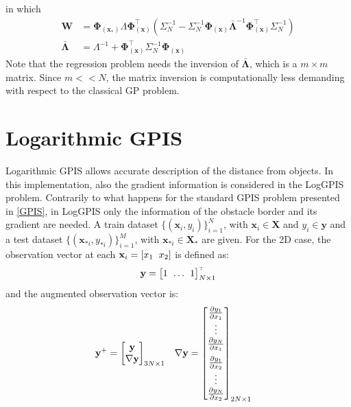 \documentclass[10pt,a4paper,twocolumn]{article}
\newcommand{\trsp}{{\scriptscriptstyle\top}}
\begin{document}
in which
\begin{align*}
	\mathbf{W} &= \mathbf{\Phi}_{(\mathbf{x}_*)} \Lambda \mathbf{\Phi}_{(\mathbf{x})}^\trsp \left( \Sigma_N^{-1} - \Sigma_N^{-1} \mathbf{\Phi}_{(\mathbf{x})} \mathbf{\bar{\Lambda}}^{-1} \mathbf{\Phi}_{(\mathbf{x})}^\trsp \Sigma_N^{-1} \right) \\
	\mathbf{\bar{\Lambda}} &= \Lambda^{-1} + \mathbf{\Phi}_{(\mathbf{x})}^\trsp \Sigma_N^{-1} \mathbf{\Phi}_{(\mathbf{x})}
\end{align*}
Note that the regression problem needs the inversion of $\mathbf{\bar{\Lambda}}$, which is a $m \times m$ matrix. Since $m << N$, the matrix inversion is computationally less demanding with respect to the classical GP problem.
\section{Logarithmic GPIS}
Logarithmic GPIS \cite{wu_faithful_2021} allows accurate description of the distance from objects. In this implementation, also the gradient information is considered in the LogGPIS problem. Contrarily to what happens for the standard GPIS problem presented in \autoref{GPIS}, in LogGPIS only the information of the obstacle border and its gradient are needed. A train dataset $ \{ (\mathbf{x}_i, y_i) \}_{i=1}^N$, with $\mathbf{x}_i \in \mathbf{X}$ and $y_i \in \mathbf{y}$ and a test dataset $\{ (\mathbf{x}_{*i}, y_{*i}) \}_{i=1}^M$, with $\mathbf{x}_{*i} \in \mathbf{X_*}$ are given. For the 2D case, the observation vector at each $\mathbf{x}_i = [ x_1 \hspace{2mm} x_2]$ is defined as:
\begin{equation}
	\mathbf{y} = 
	\begin{bmatrix}
		1 \hspace{-5mm} && \ldots && \hspace{-5mm} 1
	\end{bmatrix}^\trsp_{N \times 1}
\end{equation}
and the augmented observation vector is:
\begin{align*}
	\mathbf{y}^+ &= 
	\begin{bmatrix}
		\mathbf{y}	 \\
		\mathbf{\nabla y}
	\end{bmatrix}_{3N \times 1}
	&&
	\mathbf{\nabla y} = 
	\begin{bmatrix}
		\frac{\partial y_1}{\partial x_1} \\
		\vdots \\
		\frac{\partial y_N}{\partial x_1} \vspace{2mm}\\
		\frac{\partial y_1}{\partial x_2} \\
		\vdots \\
		\frac{\partial y_N}{\partial x_2} \\
	\end{bmatrix}_{2N \times 1}
\end{align*}
\end{document}
